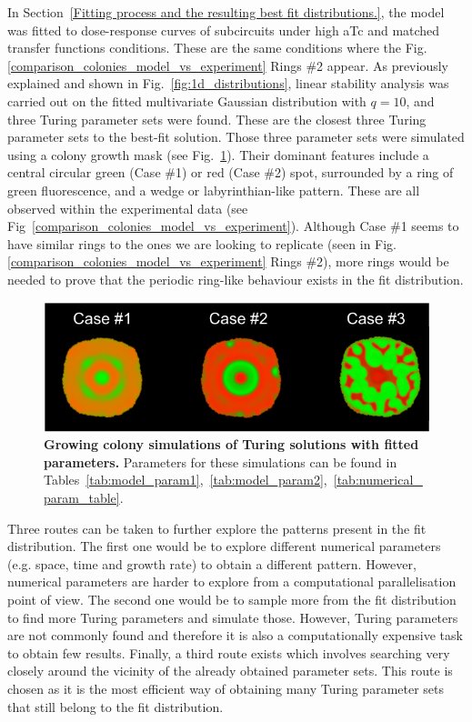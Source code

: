 In Section~\ref{Fitting process and the resulting best fit distributions.}, the model was fitted to dose-response curves of subcircuits under high aTc and matched transfer functions conditions.
These are the same conditions where the Fig.\ref{comparison_colonies_model_vs_experiment} Rings \#2 appear.
As previously explained and shown in Fig.~\ref{fig:1d_distributions}, linear stability analysis was carried out on the fitted multivariate Gaussian distribution with $q=10$, and three Turing parameter sets were found.
These are the closest three Turing parameter sets to the best-fit solution.
Those three parameter sets were simulated using a colony growth mask (see Fig.~\ref{best_fit_colony_turing}).
Their dominant features include a central circular green (Case \#1) or red (Case \#2) spot, surrounded by a ring of green fluorescence, and a wedge or labyrinthian-like pattern.
These are all observed within the experimental data (see Fig~\ref{comparison_colonies_model_vs_experiment}).
Although Case \#1 seems to have similar rings to the ones we are looking to replicate (seen in Fig.\ref{comparison_colonies_model_vs_experiment} Rings \#2), more rings would be needed to prove that the periodic ring-like behaviour exists in the fit distribution.

\begin{figure}[H]
    \centering
    \includegraphics[width=1\textwidth]{chapters/Chapter 3/best_fit_colony_turing}
    \caption{\textbf{Growing colony simulations of Turing solutions with fitted parameters.} Parameters for these simulations can be found in Tables~\ref{tab:model_param1},~\ref{tab:model_param2},~\ref{tab:numerical_param_table}.}
    \label{best_fit_colony_turing}
\end{figure} %

Three routes can be taken to further explore the patterns present in the fit distribution.
The first one would be to explore different numerical parameters (e.g. space, time and growth rate) to obtain a different pattern.
However, numerical parameters are harder to explore from a computational parallelisation point of view.
The second one would be to sample more from the fit distribution to find more Turing parameters and simulate those.
However, Turing parameters are not commonly found and therefore it is also a computationally expensive task to obtain few results.
Finally, a third route exists which involves searching very closely around the vicinity of the already obtained parameter sets.
This route is chosen as it is the most efficient way of obtaining many Turing parameter sets that still belong to the fit distribution.

